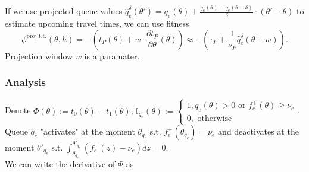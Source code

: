 \documentclass[12pt]{article}
\begin{document}
If we use projected queue values $\hat{q}^{\delta}_e(\theta') = q_e(\theta) + \frac{q_e(\theta) - q_e(\theta - \delta)}{\delta} \cdot (\theta' - \theta)$ to estimate upcoming travel times, we can use fitness $$ \phi^{\text{proj t.t.}}(\theta, h) = -(t_P(\theta) + w \cdot \frac{\partial t_P}{\partial \theta}(\theta)) \approx - ( \tau_P + \frac{1}{\nu_P} \hat{q}^{\delta}_e(\theta + w) ). $$  Projection window $w$ is a paramater. 

\subsubsection*{Analysis}
Denote  $\Phi(\theta) := t_0(\theta) - t_1(\theta)$,  $\mathbb{I}_{q_e}(\theta) := \begin{cases} 1, q_e(\theta) > 0 \text{ or } f_e^+(\theta) \geq \nu_e \\ 0, \text{ otherwise}\end{cases}$.
\\
Queue $q_e$ "activates" at the moment $ \theta_{q_e} $ s.t. $f_e^+( \theta_{q_e}) = \nu_e $ and deactivates at the moment $\theta'_{q_e}$ s.t. $\int_{\theta_{q_e}}^{ \theta'_{q_e}} (f_e^+(z) - \nu_e)  dz  = 0$.
\\
We can write the derivative of $\Phi$ as
\end{document}
